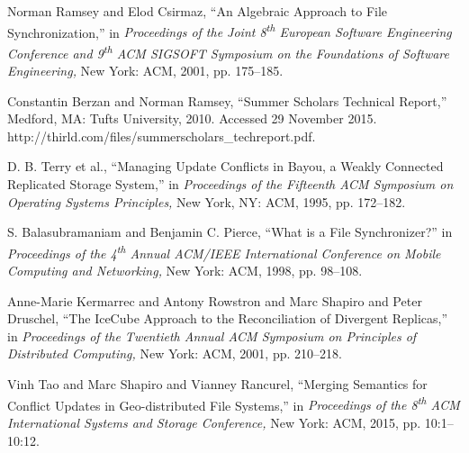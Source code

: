 
Norman Ramsey and Elod Csirmaz,
``An Algebraic Approach to File Synchronization,''
in \emph{Proceedings of the Joint 8\textsuperscript{th} European Software Engineering Conference 
and 9\textsuperscript{th} ACM SIGSOFT Symposium on the Foundations of Software Engineering,}
New York: ACM, 2001, pp. 175--185.

Constantin Berzan and Norman Ramsey,
``Summer Scholars Technical Report,''
Medford, MA: Tufts University, 2010.
Accessed 29 November 2015.
http://thirld.com/files/summerscholars\_techreport.pdf.

D. B. Terry et al.,
``Managing Update Conflicts in Bayou, a Weakly Connected Replicated Storage System,''
in \emph{Proceedings of the Fifteenth ACM Symposium on Operating Systems Principles,}
New York, NY: ACM, 1995, pp. 172--182.


S. Balasubramaniam and Benjamin C. Pierce,
``What is a File Synchronizer?''
in \emph{Proceedings of the 4\textsuperscript{th} Annual 
ACM/IEEE International Conference on Mobile Computing and Networking,}
New York: ACM, 1998, pp. 98--108.


Anne-Marie Kermarrec and Antony Rowstron and Marc Shapiro and Peter Druschel,
``The IceCube Approach to the Reconciliation of Divergent Replicas,''
in \emph{Proceedings of the Twentieth Annual ACM Symposium on Principles of Distributed Computing,}
New York: ACM, 2001, pp. 210--218.

Vinh Tao and Marc Shapiro and Vianney Rancurel,
``Merging Semantics for Conflict Updates in Geo-distributed File Systems,''
in \emph{Proceedings of the 8\textsuperscript{th}
 ACM International Systems and Storage Conference,}
New York: ACM, 2015, pp. 10:1--10:12.
